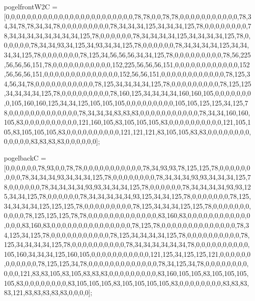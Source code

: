 pogelfrontW2C = [0,0,0,0,0,0,0,0,0,0,0,0,0,0,0,0,0,0,0,0,0,0,0,0,78,78,0,0,78,78,0,0,0,0,0,0,0,0,0,0,0,78,34,34,78,78,34,34,78,0,0,0,0,0,0,0,0,0,78,34,34,34,125,34,34,34,125,78,0,0,0,0,0,0,0,0,78,34,34,34,34,34,34,34,34,125,78,0,0,0,0,0,0,78,34,34,34,34,125,34,34,34,34,125,78,0,0,0,0,0,0,78,34,34,93,34,125,34,93,34,34,125,78,0,0,0,0,0,0,78,34,34,34,34,125,34,34,34,34,125,78,0,0,0,0,0,0,0,78,125,34,56,56,56,34,34,125,78,0,0,0,0,0,0,0,0,0,78,56,225,56,56,56,151,78,0,0,0,0,0,0,0,0,0,0,0,152,225,56,56,56,151,0,0,0,0,0,0,0,0,0,0,0,0,152,56,56,56,151,0,0,0,0,0,0,0,0,0,0,0,0,0,0,152,56,56,151,0,0,0,0,0,0,0,0,0,0,0,0,78,125,34,56,34,78,0,0,0,0,0,0,0,0,0,0,0,78,125,34,34,34,34,125,78,0,0,0,0,0,0,0,0,0,78,125,125,34,34,34,34,125,78,0,0,0,0,0,0,0,0,0,78,160,125,34,34,34,34,160,160,105,0,0,0,0,0,0,0,0,105,160,160,125,34,34,125,105,105,105,0,0,0,0,0,0,0,0,0,105,105,125,125,34,125,78,0,0,0,0,0,0,0,0,0,0,0,0,0,78,34,34,34,83,83,83,0,0,0,0,0,0,0,0,0,0,0,78,34,34,160,160,105,83,0,0,0,0,0,0,0,0,0,0,121,160,105,83,105,105,105,83,0,0,0,0,0,0,0,0,0,0,121,105,105,83,105,105,105,83,0,0,0,0,0,0,0,0,0,0,121,121,121,83,105,105,83,83,0,0,0,0,0,0,0,0,0,0,0,0,0,83,83,83,83,0,0,0,0,0,0];

pogelbackC = [0,0,0,0,0,0,78,93,0,0,78,78,0,0,0,0,0,0,0,0,0,0,0,78,34,93,93,78,125,125,78,0,0,0,0,0,0,0,0,0,78,34,34,34,93,34,34,34,125,78,0,0,0,0,0,0,0,0,78,34,34,34,93,93,34,34,34,125,78,0,0,0,0,0,0,78,34,34,34,34,93,93,34,34,34,125,78,0,0,0,0,0,0,78,34,34,34,34,93,93,125,34,34,125,78,0,0,0,0,0,0,78,34,34,34,34,34,93,125,34,34,125,78,0,0,0,0,0,0,0,78,125,34,34,34,34,125,125,125,78,0,0,0,0,0,0,0,0,0,78,125,34,34,34,125,125,78,0,0,0,0,0,0,0,0,0,0,0,78,125,125,125,78,78,0,0,0,0,0,0,0,0,0,0,0,0,0,83,160,83,0,0,0,0,0,0,0,0,0,0,0,0,0,0,0,83,160,83,0,0,0,0,0,0,0,0,0,0,0,0,0,0,0,78,125,78,0,0,0,0,0,0,0,0,0,0,0,0,0,0,78,34,125,34,125,78,0,0,0,0,0,0,0,0,0,0,0,78,125,34,34,34,34,125,78,0,0,0,0,0,0,0,0,0,0,78,125,34,34,34,34,125,78,0,0,0,0,0,0,0,0,0,0,78,34,34,34,34,34,34,78,0,0,0,0,0,0,0,0,0,0,105,160,34,34,34,125,160,105,0,0,0,0,0,0,0,0,0,0,0,121,125,34,125,125,121,0,0,0,0,0,0,0,0,0,0,0,0,78,125,125,34,78,0,0,0,0,0,0,0,0,0,0,0,0,0,78,34,125,34,78,0,0,0,0,0,0,0,0,0,0,0,121,83,83,105,83,105,83,83,83,0,0,0,0,0,0,0,0,0,83,160,105,105,83,105,105,105,105,83,0,0,0,0,0,0,0,0,83,105,105,105,83,105,105,105,105,83,0,0,0,0,0,0,0,0,83,83,83,83,121,83,83,83,83,83,0,0,0,0];

